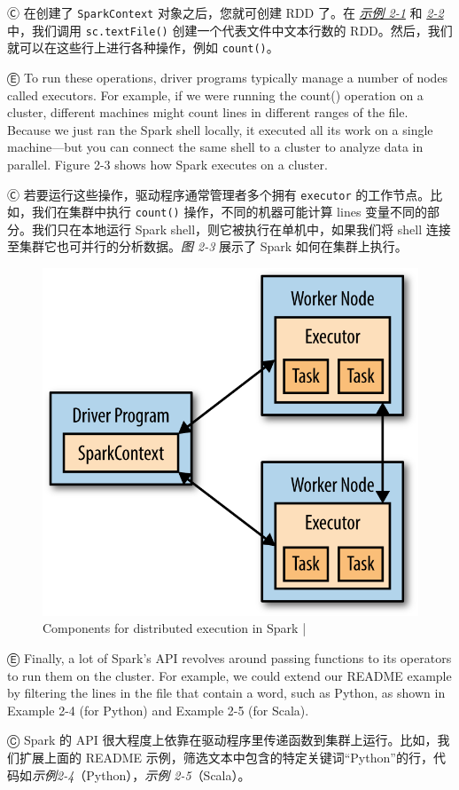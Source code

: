 Ⓒ 在创建了 \lstinline{SparkContext} 对象之后，您就可创建 RDD 了。在 \hyperref[exmp2-1]{\emph{示例 2-1}} 和 \hyperref[exmp2-2]{\emph{2-2}} 中，我们调用 \lstinline{sc.textFile()} 创建一个代表文件中文本行数的 RDD。然后，我们就可以在这些行上进行各种操作，例如 \lstinline{count()}。

Ⓔ \textcolor{etc}{To run these operations, driver programs typically manage a number of nodes called executors. For example, if we were running the count() operation on a cluster, different machines might count lines in different ranges of the file. Because we just ran the Spark shell locally, it executed all its work on a single machine---but you can connect the same shell to a cluster to analyze data in parallel. Figure 2-3 shows how Spark executes on a cluster.}

Ⓒ 若要运行这些操作，驱动程序通常管理者多个拥有 \lstinline{executor} 的工作节点。比如，我们在集群中执行 \lstinline{count()} 操作，不同的机器可能计算 lines 变量不同的部分。我们只在本地运行 Spark shell，则它被执行在单机中，如果我们将 shell 连接至集群它也可并行的分析数据。\emph{图 2-3} 展示了 Spark 如何在集群上执行。


\begin{figure}[htbp]
\centering
\includegraphics[width=.6\textwidth]{../images/fig_2-3.png}
\caption{Components for distributed execution in Spark  |  }
\end{figure} \label{fig2-3}

Ⓔ \textcolor{etc}{Finally, a lot of Spark's API revolves around passing functions to its operators to run them on the cluster. For example, we could extend our README example by filtering the lines in the file that contain a word, such as Python, as shown in Example 2-4 (for Python) and Example 2-5 (for Scala).}

Ⓒ Spark 的 API 很大程度上依靠在驱动程序里传递函数到集群上运行。比如，我们扩展上面的 README 示例，筛选文本中包含的特定关键词``Python''的行，代码如\emph{示例2-4}（Python），\emph{示例 2-5}（Scala）。

